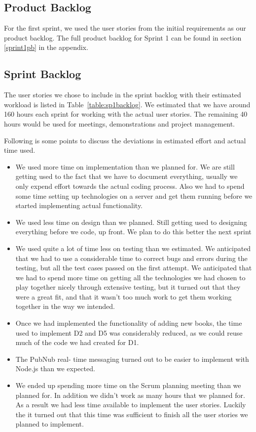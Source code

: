 \subsection{Product Backlog}
For the first sprint, we used the user stories from the initial requirements as our product backlog. The full product backlog for Sprint 1 can be found in section \ref{sprint1pb} in the appendix.

\subsection{Sprint Backlog}
The user stories we chose to include in the sprint backlog with their estimated workload is listed in Table~\ref{table:sp1backlog}. We estimated that we have around 160 hours each sprint for working with the actual user stories. The remaining 40 hours would be used for meetings, demonstrations and project management.

Following is some points to discuss the deviations in estimated effort and actual time used.
\begin{itemize}
\item We used more time on implementation than we planned for. We are still getting used to the fact that we have to document everything, usually we only expend effort towards the actual coding process. Also we had to spend some time setting up technologies on a server and get them running before we started implementing actual functionality.
\item We used less time on design than we planned. Still getting used to designing everything before we code, up front. We plan to do this better the next sprint
\item We used quite a lot of time less on testing than we estimated. We anticipated that we had to use a considerable time to correct bugs and errors during the testing, but all the test cases passed on the first attempt. We anticipated that we had to spend more time on getting all the technologies we had chosen to play together nicely through extensive testing, but it turned out that they were a great fit, and that it wasn't too much work to get them working together in the way we intended.
\item Once we had implemented the functionality of adding new books, the time used to implement D2 and D5 was considerably reduced, as we could reuse much of the code we had created for D1.
\item The PubNub real- time messaging turned out to be easier to implement with Node.js than we expected. 
\item We ended up spending more time on the Scrum planning meeting than we planned for. In addition we didn't work as many hours that we planned for. As a result we had less time available to implement the user stories. Luckily the it turned out that this time was sufficient to finish all the user stories we planned to implement.
\end{itemize}

